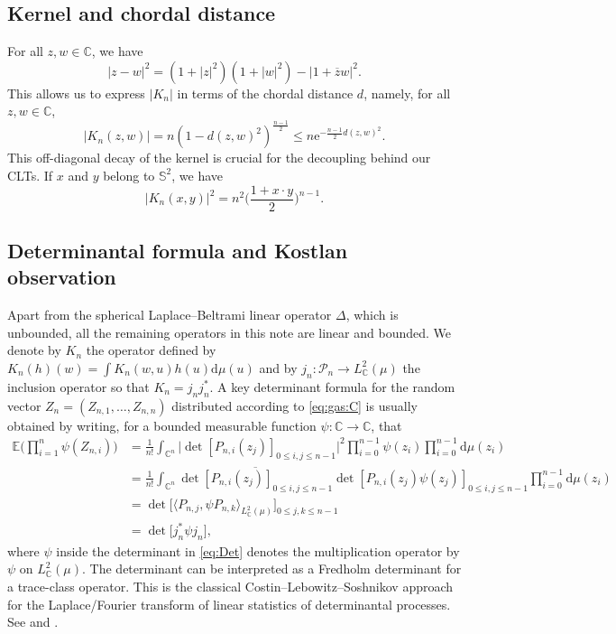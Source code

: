 \documentclass[10pt,reqno]{amsart}
\numberwithin{equation}{section}
\numberwithin{figure}{section}
\theoremstyle{plain}
\newcommand{\<}{\langle}
\renewcommand{\>}{\rangle}
\begin{document}
\subsection{Kernel and chordal distance}
For all $z,w\in\mathbb{C}$, we have
\begin{equation}
  |z-w|^2=(1+|z|^2)(1+|w|^2)-|1+\overline{z}w|^2.
\end{equation}
This allows us to express $|K_n|$ in terms of the chordal distance $d$, namely, for
all $z,w\in\mathbb{C}$,
\begin{equation}\label{eq:kernel-distance}
  |K_n(z,w)| = n(1-d(z,w)^2)^{\frac{n-1}{2}}\leq n\mathrm{e}^{-\frac{n-1}{2}d(z,w)^2}.
\end{equation}
%
%
%
%
%
%
%
%
%
%
%
%
This off-diagonal decay of the kernel is crucial for the decoupling behind our CLTs.
If $x$ and $y$ belong to $\mathbb S^2$, we have
\begin{equation}
\label{eq:Knxy}
|K_n(x,y)|^2 =n^2\Big(\frac{1+x\cdot y}{2}\Big)^{n-1}.
\end{equation}

\subsection{Determinantal formula and Kostlan observation}

Apart from the spherical Laplace--Beltrami linear operator $\Delta$, which is
unbounded, all the remaining operators in this note are linear and bounded.
%
We denote by $K_n$ the operator defined by
$K_n(h)(w)=\int K_n(w,u)h(u)\mathrm{d}\mu(u)$
and by $j_n: \mathcal P_n \to L^2_{\mathbb C}(\mu)$
the inclusion operator so that
$K_n = j_n^{} j_n^*$. 
A key determinant formula for the random vector
 $Z_n=(Z_{n,1},\ldots,Z_{n,n})$ distributed according to \eqref{eq:gas:C} 
 is usually obtained by writing, 
 for a bounded measurable function 
 $\psi: \mathbb C \to \mathbb C$, that
 \begin{align}
 \mathbb E \Big( \prod_{i=1}^n \psi(Z_{n,i})\Big)
 &= 
 \frac{1}{n!}
 \int_{\mathbb C^n}
 \Big|\det{[P_{n,i}(z_j)]}_{0\leq i,j\leq n-1} \Big|^2 
 \prod_{i=0}^{n-1} \psi(z_i)     
 \prod_{i=0}^{n-1} \mathrm d \mu(z_i)     
 \\
 &=\frac{1}{n!}
 \int_{\mathbb C^n}
 \overline{\det{[P_{n,i}(z_j)]}_{0\leq i,j\leq n-1}}
 \det{[P_{n,i}(z_j) \psi(z_j)]}_{0\leq i,j\leq n-1}
 \prod_{i=0}^{n-1} \mathrm d \mu(z_i)            \\
 &=\det\Big[\langle P_{n,j},\psi P_{n,k}\rangle_{L^2_{\mathbb{C}}(\mu)}\Big]_{0\leq j,k\leq n-1}                   
                \label{eq:DetExplicit}     \\
 &
 = \det \big[j_n^* \psi j_n^{} \big] \label{eq:Det},
 \end{align}
 where $\psi$ inside the determinant in \eqref{eq:Det} 
 denotes
 the multiplication operator by
 $\psi$ on $L^2_{\mathbb C}(\mu)$.
The determinant can be interpreted as a Fredholm determinant for a trace-class operator.
This is the classical Costin--Lebowitz--Soshnikov approach for the
Laplace/Fourier transform of linear statistics of determinantal processes. See
\cite[Section 4.3.8]{MR2552864} and \cite{PhysRevLett.75.69,MR1894104}.
\end{document}
